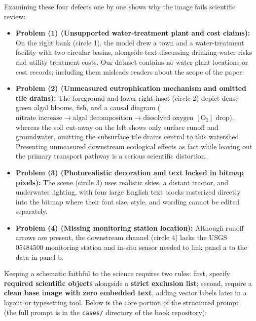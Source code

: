 Examining these four defects one by one shows why the image fails scientific review:
\begin{itemize}
\item \textbf{Problem (1) (Unsupported water-treatment plant and cost claims):} On the right bank (circle 1), the model drew a town and a water-treatment facility with two circular basins, alongside text discussing drinking-water risks and utility treatment costs. Our dataset contains no water-plant locations or cost records; including them misleads readers about the scope of the paper.
\item \textbf{Problem (2) (Unmeasured eutrophication mechanism and omitted tile drains):} The foreground and lower-right inset (circle 2) depict dense green algal blooms, fish, and a causal diagram ($\text{nitrate increase} \rightarrow \text{algal decomposition} \rightarrow \text{dissolved oxygen } [\text{O}_2] \text{ drop}$), whereas the soil cut-away on the left shows only surface runoff and groundwater, omitting the subsurface tile drains central to this watershed. Presenting unmeasured downstream ecological effects as fact while leaving out the primary transport pathway is a serious scientific distortion.
\item \textbf{Problem (3) (Photorealistic decoration and text locked in bitmap pixels):} The scene (circle 3) uses realistic skies, a distant tractor, and underwater lighting, with four large English text blocks rasterized directly into the bitmap where their font size, style, and wording cannot be edited separately.
\item \textbf{Problem (4) (Missing monitoring station location):} Although runoff arrows are present, the downstream channel (circle 4) lacks the USGS 05484500 monitoring station and in-situ sensor needed to link panel a to the data in panel b.
\end{itemize}

Keeping a schematic faithful to the science requires two rules: first, specify \textbf{required scientific objects} alongside a \textbf{strict exclusion list}; second, require a \textbf{clean base image with zero embedded text}, adding vector labels later in a layout or typesetting tool. Below is the core portion of the structured prompt (the full prompt is in the \texttt{cases/} directory of the book repository):

